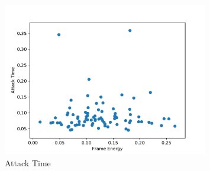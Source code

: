 \begin{figure}[H]
    \center
    \includegraphics[width = 0.8\textwidth]{Figures/att.pdf}
    \caption{Attack Time}
    \label{fig:im}
\end{figure}